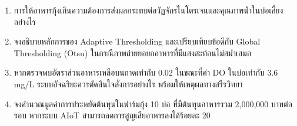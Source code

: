 \begin{enumerate}
    \item การให้อาหารกุ้งเกินความต้องการส่งผลกระทบต่อวัฏจักรไนโตรเจนและคุณภาพน้ำในบ่อเลี้ยงอย่างไร
    \item จงอธิบายหลักการของ Adaptive Thresholding และเปรียบเทียบข้อดีกับ Global Thresholding (Otsu) ในกรณีภาพถ่ายยอยกอาหารที่มีแสงสะท้อนไม่สม่ำเสมอ
    \item หากตรวจพบอัตราส่วนอาหารเหลือบนถาดเท่ากับ 0.02 ในขณะที่ค่า DO ในบ่อเท่ากับ 3.6 mg/L ระบบอัจฉริยะควรตัดสินใจสั่งการอย่างไร พร้อมให้เหตุผลทางสรีรวิทยา
    \item จงคำนวณมูลค่าการประหยัดต้นทุนในฟาร์มกุ้ง 10 บ่อ ที่มีต้นทุนอาหารรวม 2,000,000 บาทต่อรอบ หากระบบ AIoT สามารถลดการสูญเสียอาหารลงได้ร้อยละ 20
\end{enumerate}
\clearpage
